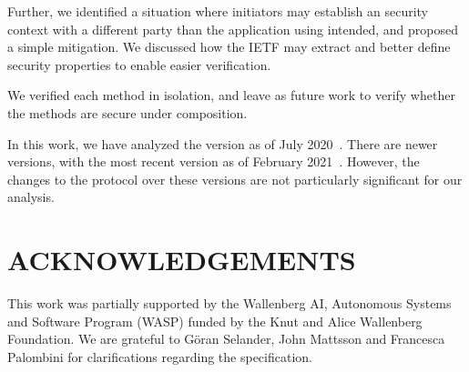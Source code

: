 \documentclass[runningheads]{llncs}
\begin{document}
Further, we identified a situation where initiators may establish an \mOscore{}
security context with a different party than the application using \mEdhoc{}
intended, and proposed a simple mitigation.
%
We discussed how the IETF may extract and better define security properties to
enable easier verification.

We verified each method in isolation, and leave as future work to verify whether
the methods are secure under composition.

In this work, we have analyzed the \mEdhoc{} version as of July
2020~\cite{our-analysis-selander-lake-edhoc-00}.
%
There are newer versions, with the most recent version as
of February 2021~\cite{latest-ietf-lake-edhoc-05}.
%
However, the changes to the protocol over these versions are not
particularly significant for our analysis.
%

\section*{ACKNOWLEDGEMENTS}
This work was partially supported by
the Wallenberg AI, Autonomous Systems and Software Program (WASP) funded by
the Knut and Alice Wallenberg Foundation.
%
We are grateful to G\"oran Selander, John Mattsson and Francesca Palombini for
clarifications regarding the specification.
%


{\small
    
}
\end{document}
